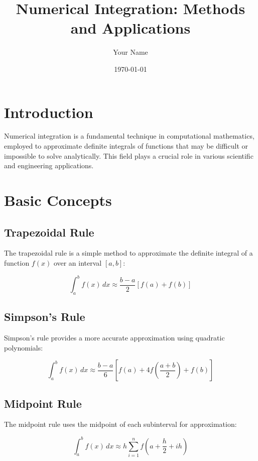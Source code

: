 \documentclass{article}
\title{Numerical Integration: Methods and Applications}
\author{Your Name}
\date{\today}
\begin{document}
\maketitle

\section{Introduction}

Numerical integration is a fundamental technique in computational mathematics, employed to approximate definite integrals of functions that may be difficult or impossible to solve analytically. This field plays a crucial role in various scientific and engineering applications.

\section{Basic Concepts}

\subsection{Trapezoidal Rule}

The trapezoidal rule is a simple method to approximate the definite integral of a function $f(x)$ over an interval $[a, b]$:

\begin{equation}
    \int_{a}^{b} f(x) \,dx \approx \frac{b - a}{2} \left[f(a) + f(b)\right]
\end{equation}

\subsection{Simpson's Rule}

Simpson's rule provides a more accurate approximation using quadratic polynomials:

\begin{equation}
    \int_{a}^{b} f(x) \,dx \approx \frac{b - a}{6} \left[f(a) + 4f\left(\frac{a+b}{2}\right) + f(b)\right]
\end{equation}

\subsection{Midpoint Rule}

The midpoint rule uses the midpoint of each subinterval for approximation:

\begin{equation}
    \int_{a}^{b} f(x) \,dx \approx h \sum_{i=1}^{n} f\left(a + \frac{h}{2} + ih\right)
\end{equation}
\end{document}
